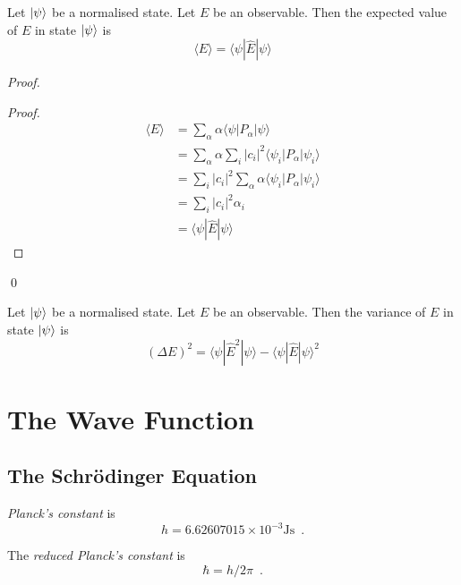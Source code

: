 \begin{prop}
Let $\left| {\psi} \right\rangle$ be a normalised state. Let $E$ be an observable. Then the expected value of $E$ in state $\left| {\psi} \right\rangle$ is
\[ \langle E \rangle = \langle \psi | \hat{E} | \psi \rangle \]
\end{prop}

\begin{proof}
\pf
{}
\begin{proof}
\pf
\begin{align*}
\langle E \rangle & = \sum_\alpha \alpha \langle \psi | P_\alpha | \psi \rangle \\
& = \sum_\alpha \alpha \sum_i |c_i|^2 \langle \psi_i | P_\alpha | \psi_i \rangle \\
& = \sum_i |c_i|^2 \sum_\alpha \alpha \langle \psi_i | P_\alpha | \psi_i \rangle \\
& = \sum_i |c_i|^2 \alpha_i \\
& = \langle \psi | \hat{E} | \psi \rangle
\end{align*}
\end{proof}
\qed
\end{proof}

\begin{cor}
Let $\left| {\psi} \right\rangle$ be a normalised state. Let $E$ be an observable. Then the variance of $E$ in state $\left| {\psi} \right\rangle$ is \[ (\Delta E)^2 = \langle \psi | \hat{E}^2 | \psi \rangle - \langle \psi | \hat{E} | \psi \rangle^2 \]
\end{cor}

\chapter{The Wave Function}

\section{The Schr\"{o}dinger Equation}

\begin{df}
\emph{Planck's constant} is
\[ h = 6.62607015 \times 10^{-3} \mathrm{Js} \enspace . \]
\end{df}

\begin{df}
The \emph{reduced Planck's constant} is
\[ \hbar = h / 2 \pi \enspace . \]
\end{df}

